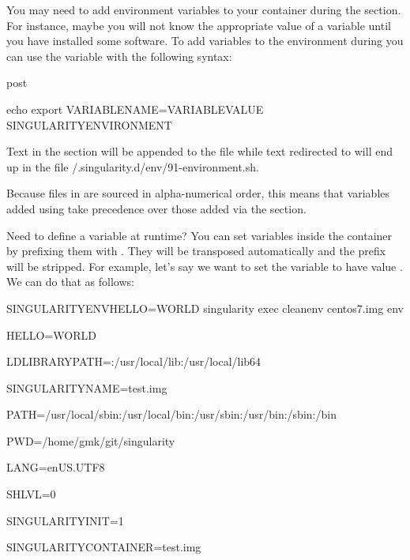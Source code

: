\documentclass[letterpaper,10pt,english]{sphinxmanual}
\begin{document}
You may need to add environment variables to your container during the
 section. For instance, maybe you will not know the appropriate
value of a variable until you have installed some software.
To add variables to the environment during  you can use the
 variable with the following syntax:

%
\begin{sphinxVerbatim}[commandchars=\\\{\}]
\PYGZpc{}post

    echo \PYGZsq{}export VARIABLE\PYGZus{}NAME=VARIABLE\PYGZus{}VALUE\PYGZsq{} \PYGZgt{}\PYGZgt{}\PYGZdl{}SINGULARITY\PYGZus{}ENVIRONMENT
\end{sphinxVerbatim}

Text in the  section will be appended to the file  while text redirected
to  will end up in the file /.singularity.d/env/91-environment.sh.

Because files in  are sourced in alpha-numerical order, this means that
variables added using  take precedence over those added via the 
section.

Need to define a variable at runtime? You can set variables inside the
container by prefixing them with . They will be
transposed automatically and the prefix will be stripped. For example,
let’s say we want to set the variable  to have value . We can do that
as follows:

%
\begin{sphinxVerbatim}[commandchars=\\\{\}]
\PYGZdl{} SINGULARITYENV\PYGZus{}HELLO=WORLD singularity exec \PYGZhy{}\PYGZhy{}cleanenv centos7.img env

HELLO=WORLD

LD\PYGZus{}LIBRARY\PYGZus{}PATH=:/usr/local/lib:/usr/local/lib64

SINGULARITY\PYGZus{}NAME=test.img

PATH=/usr/local/sbin:/usr/local/bin:/usr/sbin:/usr/bin:/sbin:/bin

PWD=/home/gmk/git/singularity

LANG=en\PYGZus{}US.UTF\PYGZhy{}8

SHLVL=0

SINGULARITY\PYGZus{}INIT=1

SINGULARITY\PYGZus{}CONTAINER=test.img
\end{sphinxVerbatim}
\end{document}
